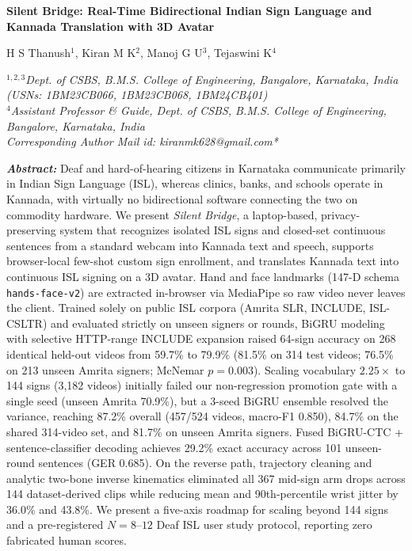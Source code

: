 \documentclass[a4paper,12pt]{article}
\begin{document}
\thispagestyle{fancy}

\begin{center}
  {\fontsize{14}{17}\selectfont\bfseries
  Silent Bridge: Real-Time Bidirectional Indian Sign Language and Kannada Translation with 3D Avatar\par}
  \vspace{6pt}
  {\fontsize{11}{13}\selectfont
  H S Thanush$^{1}$, Kiran M K$^{2}$, Manoj G U$^{3}$, Tejaswini K$^{4}$\par}
  \vspace{2pt}
  {\fontsize{11}{13}\selectfont\itshape
  $^{1,2,3}$Dept. of CSBS, B.M.S. College of Engineering, Bangalore, Karnataka, India (USNs: 1BM23CB066, 1BM23CB068, 1BM24CB401)\\
  $^{4}$Assistant Professor \& Guide, Dept. of CSBS, B.M.S. College of Engineering, Bangalore, Karnataka, India\\
  Corresponding Author Mail id: kiranmk628@gmail.com*\par}
\end{center}
\vspace{6pt}

\noindent\textbf{\textit{Abstract:}} Deaf and hard-of-hearing citizens in Karnataka communicate primarily in Indian Sign Language (ISL), whereas clinics, banks, and schools operate in Kannada, with virtually no bidirectional software connecting the two on commodity hardware. We present \textit{Silent Bridge}, a laptop-based, privacy-preserving system that recognizes isolated ISL signs and closed-set continuous sentences from a standard webcam into Kannada text and speech, supports browser-local few-shot custom sign enrollment, and translates Kannada text into continuous ISL signing on a 3D avatar. Hand and face landmarks (147-D schema \texttt{hands-face-v2}) are extracted in-browser via MediaPipe so raw video never leaves the client. Trained solely on public ISL corpora (Amrita SLR, INCLUDE, ISL-CSLTR) and evaluated strictly on unseen signers or rounds, BiGRU modeling with selective HTTP-range INCLUDE expansion raised 64-sign accuracy on 268 identical held-out videos from 59.7\% to 79.9\% (81.5\% on 314 test videos; 76.5\% on 213 unseen Amrita signers; McNemar $p = 0.003$). Scaling vocabulary $2.25\times$ to 144 signs (3,182 videos) initially failed our non-regression promotion gate with a single seed (unseen Amrita 70.9\%), but a 3-seed BiGRU ensemble resolved the variance, reaching 87.2\% overall (457/524 videos, macro-F1 0.850), 84.7\% on the shared 314-video set, and 81.7\% on unseen Amrita signers. Fused BiGRU-CTC + sentence-classifier decoding achieves 29.2\% exact accuracy across 101 unseen-round sentences (GER 0.685). On the reverse path, trajectory cleaning and analytic two-bone inverse kinematics eliminated all 367 mid-sign arm drops across 144 dataset-derived clips while reducing mean and 90th-percentile wrist jitter by 36.0\% and 43.8\%. We present a five-axis roadmap for scaling beyond 144 signs and a pre-registered $N = 8$--$12$ Deaf ISL user study protocol, reporting zero fabricated human scores.
\end{document}
